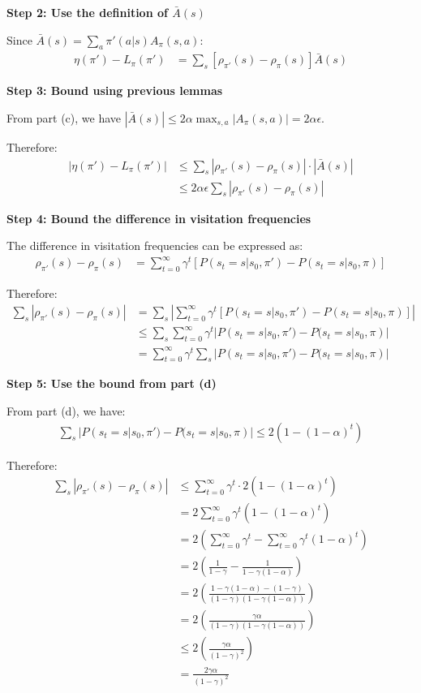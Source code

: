 \textbf{Step 2: Use the definition of $\bar{A}(s)$}

Since $\bar{A}(s) = \sum_{a}\pi'(a|s)A_{\pi}(s, a)$:
\begin{align}
\eta(\pi') - L_{\pi}(\pi') &= \sum_{s}[\rho_{\pi'}(s) - \rho_{\pi}(s)]\bar{A}(s)
\end{align}

\textbf{Step 3: Bound using previous lemmas}

From part (c), we have $|\bar{A}(s)| \le 2\alpha \max_{s, a}|A_{\pi}(s,a)| = 2\alpha\epsilon$.

Therefore:
\begin{align}
|\eta(\pi') - L_{\pi}(\pi')| &\le \sum_{s} |\rho_{\pi'}(s) - \rho_{\pi}(s)| \cdot |\bar{A}(s)| \\
&\le 2\alpha\epsilon \sum_{s} |\rho_{\pi'}(s) - \rho_{\pi}(s)|
\end{align}

\textbf{Step 4: Bound the difference in visitation frequencies}

The difference in visitation frequencies can be expressed as:
\begin{align}
\rho_{\pi'}(s) - \rho_{\pi}(s) &= \sum_{t=0}^{\infty} \gamma^t [P(s_t = s | s_0, \pi') - P(s_t = s | s_0, \pi)]
\end{align}

Therefore:
\begin{align}
\sum_{s} |\rho_{\pi'}(s) - \rho_{\pi}(s)| &= \sum_{s} \left| \sum_{t=0}^{\infty} \gamma^t [P(s_t = s | s_0, \pi') - P(s_t = s | s_0, \pi)] \right| \\
&\le \sum_{s} \sum_{t=0}^{\infty} \gamma^t |P(s_t = s | s_0, \pi') - P(s_t = s | s_0, \pi)| \\
&= \sum_{t=0}^{\infty} \gamma^t \sum_{s} |P(s_t = s | s_0, \pi') - P(s_t = s | s_0, \pi)|
\end{align}

\textbf{Step 5: Use the bound from part (d)}

From part (d), we have:
\begin{align}
\sum_{s} |P(s_t = s | s_0, \pi') - P(s_t = s | s_0, \pi)| \le 2(1-(1-\alpha)^t)
\end{align}

Therefore:
\begin{align}
\sum_{s} |\rho_{\pi'}(s) - \rho_{\pi}(s)| &\le \sum_{t=0}^{\infty} \gamma^t \cdot 2(1-(1-\alpha)^t) \\
&= 2 \sum_{t=0}^{\infty} \gamma^t (1-(1-\alpha)^t) \\
&= 2 \left( \sum_{t=0}^{\infty} \gamma^t - \sum_{t=0}^{\infty} \gamma^t (1-\alpha)^t \right) \\
&= 2 \left( \frac{1}{1-\gamma} - \frac{1}{1-\gamma(1-\alpha)} \right) \\
&= 2 \left( \frac{1-\gamma(1-\alpha) - (1-\gamma)}{(1-\gamma)(1-\gamma(1-\alpha))} \right) \\
&= 2 \left( \frac{\gamma\alpha}{(1-\gamma)(1-\gamma(1-\alpha))} \right) \\
&\le 2 \left( \frac{\gamma\alpha}{(1-\gamma)^2} \right) \\
&= \frac{2\gamma\alpha}{(1-\gamma)^2}
\end{align}

